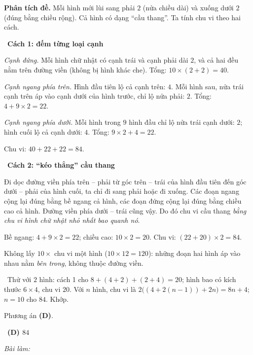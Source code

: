 \documentclass[11pt]{article}
\newif\ifsol \solfalse
\providecommand{\AnsWord}{Đáp số}
\newcommand{\ans}[1]{\par\smallskip{\bfseries\color{tmGreen!88!black}\AnsWord:}\ {\bfseries\color{AnsRed}#1}\par}
\newcommand{\probsol}[1]{%
  \begin{lrbox}{\solmeasure}\begin{minipage}{\dimexpr\linewidth-24pt\relax}#1\end{minipage}\end{lrbox}%
  \ifsol
    \begin{solbox}#1\end{solbox}%
  \else
    \setlength{\solht}{\dimexpr\ht\solmeasure+\dp\solmeasure+0.85cm\relax}%
    \ifdim\solht<1.35cm\setlength{\solht}{1.35cm}\fi
    \ifdim\solht>\StudentMaxWork\setlength{\solht}{\StudentMaxWork}\fi
    \begin{tcolorbox}[colback=white,colframe=Line,boxrule=0.8pt,arc=5pt,
      left=8pt,right=8pt,top=4pt,bottom=4pt,height=\solht]{\footnotesize\color{Slate}\itshape\WorkWord}\end{tcolorbox}%
  \fi}
\newlength{\StudentMaxWork}\setlength{\StudentMaxWork}{7.5cm}
\newcommand{\step}[2]{\par\smallskip\noindent{\bfseries\color{tmBlue!85!black}\StepWord~#1.}\ {\bfseries #2}\par\nopagebreak}
\newcommand{\verify}[1]{\par\smallskip\noindent{\bfseries\color{tmGreen!80!black}\faCheckCircle\ \CheckWord}\ #1\par}
\def\WorkWord{Bài làm:}
\def\AnsWord{Đáp số}
\def\StepWord{Bước}
\def\CheckWord{Thử lại:}
\begin{document}
\probsol{
\textbf{Phân tích đề.} Mỗi hình mới lùi sang phải $2$ (nửa chiều dài) và xuống dưới $2$ (đúng bằng chiều
rộng). Cả hình có dạng ``cầu thang''. Ta tính chu vi theo hai cách.

\step{1}{Cách 1: đếm từng loại cạnh}
\emph{Cạnh đứng.} Mỗi hình chữ nhật có cạnh trái và cạnh phải dài $2$, và cả hai đều nằm trên đường viền
(không bị hình khác che). Tổng: $10\times(2+2)=40$.

\emph{Cạnh ngang phía trên.} Hình đầu tiên lộ cả cạnh trên: $4$. Mỗi hình sau, nửa trái cạnh trên áp vào
cạnh dưới của hình trước, chỉ lộ nửa phải: $2$. Tổng: $4+9\times 2=22$.

\emph{Cạnh ngang phía dưới.} Mỗi hình trong $9$ hình đầu chỉ lộ nửa trái cạnh dưới: $2$; hình cuối lộ cả
cạnh dưới: $4$. Tổng: $9\times 2+4=22$.

Chu vi: $40+22+22=84$.

\step{2}{Cách 2: ``kéo thẳng'' cầu thang}
\begin{proofbox}Đi dọc đường viền phía trên -- phải từ góc trên -- trái của hình đầu tiên đến góc dưới --
phải của hình cuối, ta chỉ đi sang phải hoặc đi xuống. Các đoạn ngang cộng lại đúng bằng bề ngang cả hình,
các đoạn đứng cộng lại đúng bằng chiều cao cả hình. Đường viền phía dưới -- trái cũng vậy. Do đó chu vi
cầu thang \emph{bằng chu vi hình chữ nhật nhỏ nhất bao quanh nó}.\end{proofbox}
Bề ngang: $4+9\times 2=22$; chiều cao: $10\times 2=20$. Chu vi: $(22+20)\times 2=84$.

\begin{warnbox}Không lấy $10\times$ chu vi một hình ($10\times 12=120$): những đoạn hai hình áp vào nhau
nằm \emph{bên trong}, không thuộc đường viền.\end{warnbox}
\verify{Thử với $2$ hình: cách 1 cho $8+(4+2)+(2+4)=20$; hình bao có kích thước $6\times 4$, chu vi $20$.
Với $n$ hình, chu vi là $2\big((4+2(n-1))+2n\big)=8n+4$; $n=10$ cho $84$. Khớp.}
Phương án \textbf{(D)}.
\ans{(D) $84$}
}
\end{document}
